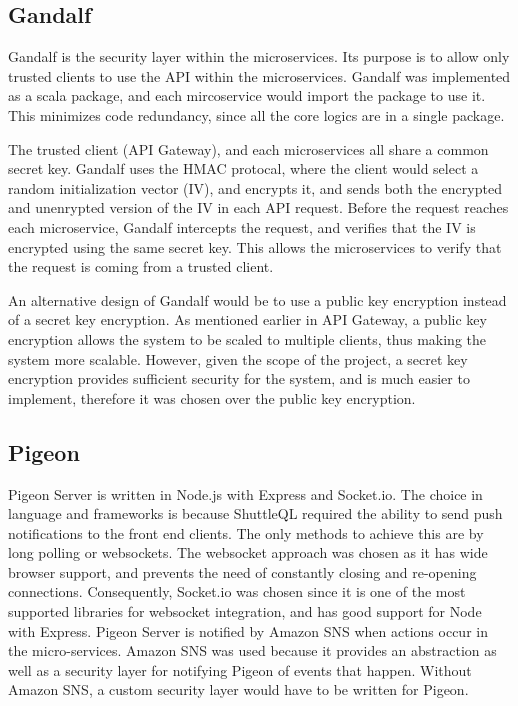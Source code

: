 \documentclass{article}
\begin{document}

\subsection{Gandalf}
Gandalf is the security layer within the microservices. Its purpose is to allow only trusted clients to use the API within the microservices. Gandalf was implemented as a scala package, and each mircoservice would import the package to use it. This minimizes code redundancy, since all the core logics are in a single package.

The trusted client (API Gateway), and each microservices all share a common secret key. Gandalf uses the HMAC protocal, where the client would select a random initialization vector (IV), and encrypts it, and sends both the encrypted and unenrypted version of the IV in each API request. Before the request reaches each microservice, Gandalf intercepts the request, and verifies that the IV is encrypted using the same secret key. This allows the microservices to verify that the request is coming from a trusted client.

An alternative design of Gandalf would be to use a public key encryption instead of a secret key encryption. As mentioned earlier in API Gateway, a public key encryption allows the system to be scaled to multiple clients, thus making the system more scalable. However, given the scope of the project, a secret key encryption provides sufficient security for the system, and is much easier to implement, therefore it was chosen over the public key encryption.

\subsection{Pigeon}
Pigeon Server is written in Node.js with Express and Socket.io. The choice in language and frameworks is because ShuttleQL required the ability to send push notifications to the front end clients. The only methods to achieve this are by long polling or websockets. The websocket approach was chosen as it has wide browser support, and prevents the need of constantly closing and re-opening connections. Consequently, Socket.io was chosen since it is one of the most supported libraries for websocket integration, and has good support for Node with Express. Pigeon Server is notified by Amazon SNS when actions occur in the micro-services. Amazon SNS was used because it provides an abstraction as well as a security layer for notifying Pigeon of events that happen. Without Amazon SNS, a custom security layer would have to be written for Pigeon.
\end{document}
